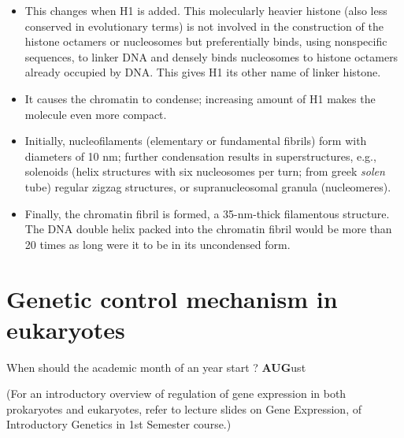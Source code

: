 \documentclass[11pt,dvipsnames,ignorenonframetext,aspectratio=169]{beamer}
\providecommand{\tightlist}{%
  \setlength{\itemsep}{0pt}\setlength{\parskip}{0pt}}
\begin{document}
\begin{frame}{}
\protect\hypertarget{section-12}{}
\small

\begin{itemize}
\tightlist
\item
  This changes when H1 is added. This molecularly heavier histone (also
  less conserved in evolutionary terms) is not involved in the
  construction of the histone octamers or nucleosomes but preferentially
  binds, using nonspecific sequences, to linker DNA and densely binds
  nucleosomes to histone octamers already occupied by DNA. This gives H1
  its other name of linker histone.
\item
  It causes the chromatin to condense; increasing amount of H1 makes the
  molecule even more compact.
\item
  Initially, nucleofilaments (elementary or fundamental fibrils) form
  with diameters of 10 nm; further condensation results in
  superstructures, e.g., solenoids (helix structures with six
  nucleosomes per turn; from greek \emph{solen} tube) regular zigzag
  structures, or supranucleosomal granula (nucleomeres).
\item
  Finally, the chromatin fibril is formed, a 35-nm-thick filamentous
  structure. The DNA double helix packed into the chromatin fibril would
  be more than 20 times as long were it to be in its uncondensed form.
\end{itemize}
\end{frame}

\hypertarget{genetic-control-mechanism-in-eukaryotes}{%
\section{Genetic control mechanism in
eukaryotes}\label{genetic-control-mechanism-in-eukaryotes}}

\begin{frame}{When should the academic month of an year start ?}
\protect\hypertarget{when-should-the-academic-month-of-an-year-start}{}
\centering \Huge \textbf{AUG}ust

\normalsize

(For an introductory overview of regulation of gene expression in both
prokaryotes and eukaryotes, refer to lecture slides on Gene Expression,
of Introductory Genetics in 1st Semester course.)
\end{frame}
\end{document}
